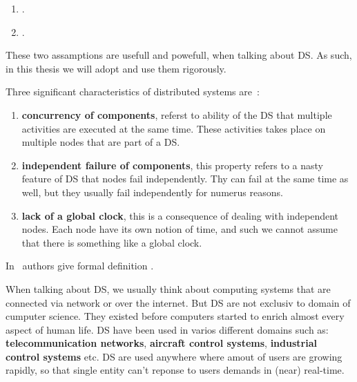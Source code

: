\begin{enumerate}[start=1,label={(\bfseries \arabic*)}]
	\item  {}.
	\item {}.\label{ds:asumption_2}
\end{enumerate}

\noindent
These two assamptions are usefull and powefull, when talking about DS. As such, in this thesis we will adopt and use them rigorously.

Three significant characteristics of distributed systems are~\cite{0019513}: 

\begin{enumerate}[start=1,label={(\bfseries \arabic*)}]
	\item \textbf{concurrency of components}, referst to ability of the DS that multiple activities are executed at the same time. These activities takes place on multiple nodes that are part of a DS.
	\item \textbf{independent failure of components}, this property refers to a nasty feature of DS that nodes fail independently. Thy can fail at the same time as well, but they usually fail independently for numerus reasons.
	\item \textbf{lack of a global clock}, this is a consequence of dealing with independent nodes. Each node have its own notion of time, and such we cannot assume that there is something like a global clock.
\end{enumerate} 

In~\cite{SteenT16} authors give formal definition .

When talking about DS, we usually think about computing systems that are connected via network or over the internet. But DS are not exclusiv to domain of cumputer science. They existed before computers started to enrich almost every aspect of human life. DS have been used in varios different domains such as: \textbf{telecommunication networks}, \textbf{aircraft control systems}, \textbf{industrial control systems} etc. DS are used anywhere where amout of users are growing rapidly, so that single entity can't reponse to users demands in (near) real-time.

